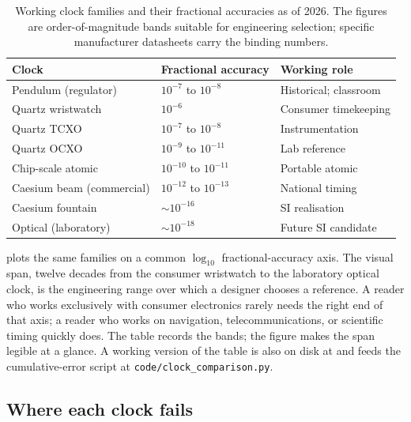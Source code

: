 \begin{table}[h]
\centering
\begin{tabular}{lll}
\toprule
Clock & Fractional accuracy & Working role \\
\midrule
Pendulum (regulator)        & $10^{-7}$ to $10^{-8}$  & Historical;
classroom \\
Quartz wristwatch           & $10^{-6}$               & Consumer
timekeeping \\
Quartz TCXO                 & $10^{-7}$ to $10^{-8}$  & Instrumentation
\\
Quartz OCXO                 & $10^{-9}$ to $10^{-11}$ & Lab reference
\\
Chip-scale atomic           & $10^{-10}$ to $10^{-11}$& Portable atomic
\\
Caesium beam (commercial)   & $10^{-12}$ to $10^{-13}$& National
timing \\
Caesium fountain            & $\sim 10^{-16}$         & SI
realisation \\
Optical (laboratory)        & $\sim 10^{-18}$         & Future SI
candidate \\
\bottomrule
\end{tabular}
\caption{Working clock families and their fractional accuracies as
of 2026. The figures are order-of-magnitude bands suitable for
engineering selection; specific manufacturer datasheets carry the
binding numbers.}
\label{tab:vol01-ch06-clock-families}
\end{table}



 plots the same families on a
common $\log_{10}$ fractional-accuracy axis. The visual span,
twelve decades from the consumer wristwatch to the laboratory
optical clock, is the engineering range over which a designer
chooses a reference. A reader who works exclusively with consumer
electronics rarely needs the right end of that axis; a reader who
works on navigation, telecommunications, or scientific timing
quickly does. The table records the bands; the figure makes the
span legible at a glance. A working version of the table is also
on disk at  and feeds the
cumulative-error script at \texttt{code/clock\_comparison.py}.

\subsection{Where each clock fails}

